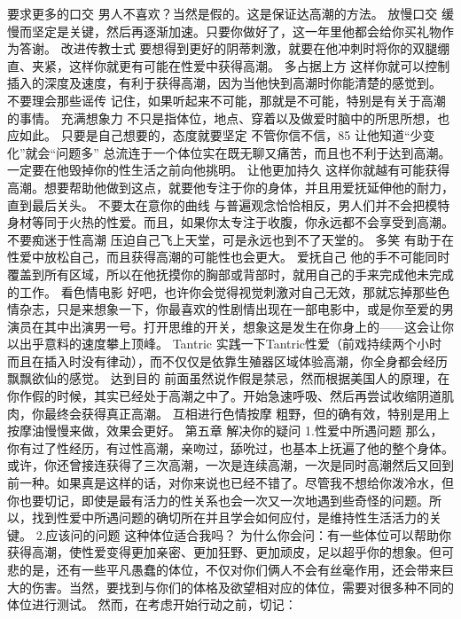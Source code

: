 \documentclass[12pt,UTF8]{ctexbook}
\begin{document}
要求更多的口交
男人不喜欢？当然是假的。这是保证达高潮的方法。
放慢口交
缓慢而坚定是关键，然后再逐渐加速。只要你做好了，这一年里他都会给你买礼物作为答谢。
改进传教士式
要想得到更好的阴蒂刺激，就要在他冲刺时将你的双腿绷直、夹紧，这样你就更有可能在性爱中获得高潮。
多占据上方
这样你就可以控制插入的深度及速度，有利于获得高潮，因为当他快到高潮时你能清楚的感觉到。
不要理会那些谣传
记住，如果听起来不可能，那就是不可能，特别是有关于高潮的事情。
充满想象力
不只是指体位，地点、穿着以及做爱时脑中的所思所想，也应如此。
只要是自己想要的，态度就要坚定
不管你信不信，85%
让他知道“少变化”就会“问题多”
总流连于一个体位实在既无聊又痛苦，而且也不利于达到高潮。一定要在他毁掉你的性生活之前向他挑明。
让他更加持久
这样你就越有可能获得高潮。想要帮助他做到这点，就要他专注于你的身体，并且用爱抚延伸他的耐力，直到最后关头。
不要太在意你的曲线
与普遍观念恰恰相反，男人们并不会把模特身材等同于火热的性爱。而且，如果你太专注于收腹，你永远都不会享受到高潮。
不要痴迷于性高潮
压迫自己飞上天堂，可是永远也到不了天堂的。
多笑
有助于在性爱中放松自己，而且获得高潮的可能性也会更大。
爱抚自己
他的手不可能同时覆盖到所有区域，所以在他抚摸你的胸部或背部时，就用自己的手来完成他未完成的工作。
看色情电影
好吧，也许你会觉得视觉刺激对自己无效，那就忘掉那些色情杂志，只是来想象一下，你最喜欢的性剧情出现在一部电影中，或是你至爱的男演员在其中出演男一号。打开思维的开关，想象这是发生在你身上的——这会让你以出乎意料的速度攀上顶峰。
Tantric
实践一下Tantric性爱（前戏持续两个小时而且在插入时没有律动），而不仅仅是依靠生殖器区域体验高潮，你全身都会经历飘飘欲仙的感觉。
达到目的
前面虽然说作假是禁忌，然而根据美国人的原理，在你作假的时候，其实已经处于高潮之中了。开始急速呼吸、然后再尝试收缩阴道肌肉，你最终会获得真正高潮。
互相进行色情按摩
粗野，但的确有效，特别是用上按摩油慢慢来做，效果会更好。
第五章 解决你的疑问
1.性爱中所遇问题
那么，你有过了性经历，有过性高潮，亲吻过，舔吮过，也基本上抚遍了他的整个身体。或许，你还曾接连获得了三次高潮，一次是连续高潮，一次是同时高潮然后又回到前一种。如果真是这样的话，对你来说也已经不错了。尽管我不想给你泼冷水，但你也要切记，即使是最有活力的性关系也会一次又一次地遇到些奇怪的问题。所以，找到性爱中所遇问题的确切所在并且学会如何应付，是维持性生活活力的关键。
2.应该问的问题
这种体位适合我吗？
为什么你会问：有一些体位可以帮助你获得高潮，使性爱变得更加亲密、更加狂野、更加顽皮，足以超乎你的想象。但可悲的是，还有一些平凡愚蠢的体位，不仅对你们俩人不会有丝毫作用，还会带来巨大的伤害。当然，要找到与你们的体格及欲望相对应的体位，需要对很多种不同的体位进行测试。
然而，在考虑开始行动之前，切记：
\end{document}
